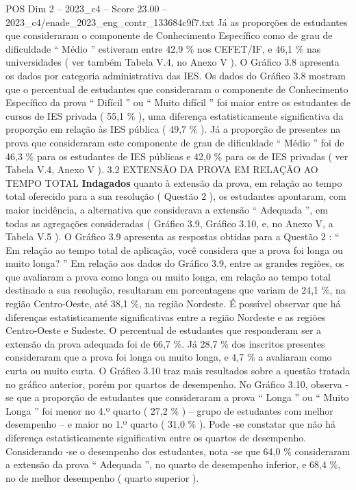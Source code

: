 \begin{textsample}{POS Dim 2 – 2023\_c4 – Score 23.00 – 2023\_c4/enade\_2023\_eng\_contr\_133684c9f7.txt}
Já as proporções de estudantes que consideraram o componente de Conhecimento Específico como de grau de dificuldade “ Médio ” estiveram entre 42,9 \% nos CEFET/IF, e 46,1 \% nas universidades ( ver também Tabela V.4, no Anexo V ).
O Gráfico 3.8 apresenta os dados por categoria administrativa das IES.
Os dados do Gráfico 3.8 mostram que o percentual de estudantes que consideraram o componente de Conhecimento Específico da prova “ Difícil ” ou “ Muito difícil ” foi maior entre os estudantes de cursos de IES privada ( 55,1 \% ), uma diferença estatisticamente significativa da proporção em relação às IES pública ( 49,7 \% ).
Já a proporção de presentes na prova que consideraram este componente de grau de dificuldade “ Médio ” foi de 46,3 \% para os estudantes de IES públicas e 42,0 \% para os de IES privadas ( ver Tabela V.4, Anexo V ). 3.2 EXTENSÃO DA PROVA EM RELAÇÃO AO TEMPO TOTAL \textbf{Indagados} quanto à extensão da prova, em relação ao tempo total oferecido para a sua resolução ( Questão 2 ), os estudantes apontaram, com maior incidência, a alternativa que considerava a extensão “ Adequada ”, em todas as agregações consideradas ( Gráfico 3.9, Gráfico 3.10, e, no Anexo V, a Tabela V.5 ).
O Gráfico 3.9 apresenta as respostas obtidas para a Questão 2 : “ Em relação ao tempo total de aplicação, você considera que a prova foi longa ou muito longa? ” Em relação aos dados do Gráfico 3.9, entre as grandes regiões, os que avaliaram a prova como longa ou muito longa, em relação ao tempo total destinado a sua resolução, resultaram em porcentagens que variam de 24,1 \%, na região Centro-Oeste, até 38,1 \%, na região Nordeste.
É possível observar que há diferenças estatisticamente significativas entre a região Nordeste e as regiões Centro-Oeste e Sudeste.
O percentual de estudantes que responderam ser a extensão da prova adequada foi de 66,7 \%.
Já 28,7 \% dos inscritos presentes consideraram que a prova foi longa ou muito longa, e 4,7 \% a avaliaram como curta ou muito curta.
O Gráfico 3.10 traz mais resultados sobre a questão tratada no gráfico anterior, porém por quartos de desempenho.
No Gráfico 3.10, observa -se que a proporção de estudantes que consideraram a prova “ Longa ” ou “ Muito Longa ” foi menor no 4.º quarto ( 27,2 \% ) – grupo de estudantes com melhor desempenho – e maior no 1.º quarto ( 31,0 \% ).
Pode -se constatar que não há diferença estatisticamente significativa entre os quartos de desempenho.
Considerando -se o desempenho dos estudantes, nota -se que 64,0 \% consideraram a extensão da prova “ Adequada ”, no quarto de desempenho inferior, e 68,4 \%, no de melhor desempenho ( quarto superior ).

\end{textsample}
